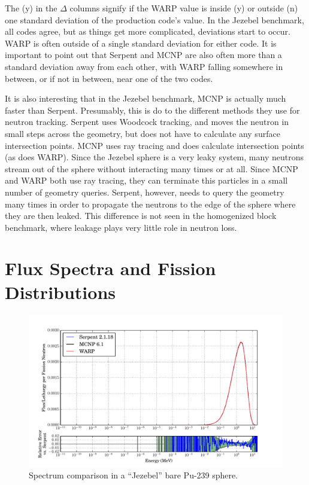 The (y) in the $\Delta$ columns signify if the WARP value is inside (y) or outside (n) one standard deviation of the production code's value.  In the Jezebel benchmark, all codes agree, but as things get more complicated, deviations start to occur.  WARP is often outside of a single standard deviation for either code.  It is important to point out that Serpent and MCNP are also often more than a standard deviation away from each other, with WARP falling somewhere in between, or if not in between, near one of the two codes.

It is also interesting that in the Jezebel benchmark, MCNP is actually much faster than Serpent.  Presumably, this is do to the different methods they use for neutron tracking.  Serpent uses Woodcock tracking, and moves the neutron in small steps across the geometry, but does not have to calculate any surface intersection points.  MCNP uses ray tracing and does calculate intersection points (as does WARP).  Since the Jezebel sphere is a very leaky system, many neutrons stream out of the sphere without interacting many times or at all.  Since  MCNP and WARP both use ray tracing, they can terminate this particles in a small number of geometry queries.  Serpent, however, needs to query the geometry many times in order to propagate the neutrons to the edge of the sphere where they are then leaked.  This difference is not seen in the homogenized block benchmark, where leakage plays very little role in neutron loss.

\section{Flux Spectra and Fission Distributions}

\begin{figure}[h!] 
\centering
\includegraphics[width=\textwidth,trim= 1cm 0cm 1cm 0cm]{graphics/finalresults/godiva_spec-6.pdf}
\caption{Spectrum comparison in a ``Jezebel'' bare Pu-239 sphere. \label{godiva_spec} }
\end{figure}

